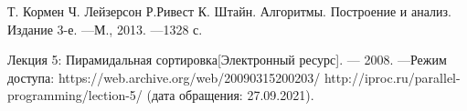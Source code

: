 \begin{thebibliography}{9}
    \label{cha:biblio}
    
     Т. Кормен Ч. Лейзерсон Р.Ривест К. Штайн. Алгоритмы. Построение
    и анализ. Издание 3-е. —М., 2013. —1328 с.
    
     Лекция 5: Пирамидальная сортировка[Электронный ресурс]. —
    2008. —Режим доступа: https://web.archive.org/web/20090315200203/
    http://iproc.ru/parallel-programming/lection-5/ (дата обращения:
    27.09.2021).
    
\end{thebibliography}
